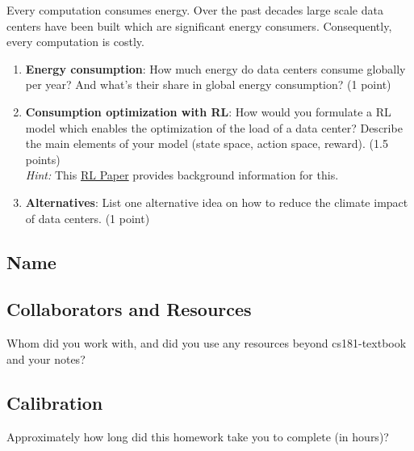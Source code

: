 \documentclass[submit]{harvardml}
\begin{document}
\newpage
\begin{problem}
Every computation consumes energy. Over the past decades large scale data centers have been built which are significant energy consumers. Consequently, every computation is costly.  

\begin{enumerate}
    \item \textbf{Energy consumption}: How much energy do data centers consume globally per year? And what's their share in global energy consumption? (1 point)
    \item \textbf{Consumption optimization with RL}: How would you formulate a RL model which enables the optimization of the load of a data center? Describe the main elements of your model (state space, action space, reward). (1.5 points)\\
   \textit{Hint:} This \href{https://people.csail.mit.edu/alizadeh/papers/deeprm-hotnets16.pdf}{RL Paper} provides background information for this.
   \item \textbf{Alternatives}: List one alternative idea on how to reduce the climate impact of data centers. (1 point)
\end{enumerate}
\end{problem}
    
\newpage
\subsection*{Name}
\subsection*{Collaborators and Resources}
Whom did you work with, and did you use any resources beyond cs181-textbook and your notes?
\subsection*{Calibration}
Approximately how long did this homework take you to complete (in hours)? 
\end{document}
